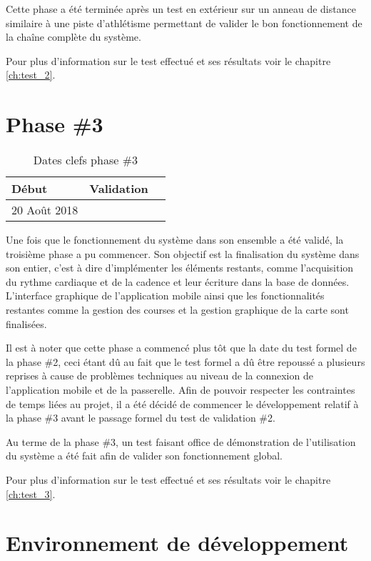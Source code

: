 Cette phase a été terminée après un test en extérieur sur un anneau de distance similaire à une piste d'athlétisme permettant de valider le bon fonctionnement de la chaîne complète du système.

Pour plus d'information sur le test effectué et ses résultats voir le chapitre \ref{ch:test_2}.

\section{Phase \#3}

\begin{table}[htb]
\caption{Dates clefs phase \#3}
\label{tab:detail_phase_3}
\centering
\begin{tabular}{ l l l }
\toprule
Début & Validation \\
\midrule
20 Août 2018 & \todo{}  \\
\bottomrule 
\end{tabular}
\end{table}

Une fois que le fonctionnement du système dans son ensemble a été validé, la troisième phase a pu commencer. Son objectif est la finalisation du système dans son entier, c'est à dire d'implémenter les éléments restants, comme l'acquisition du rythme cardiaque et de la cadence et leur écriture dans la base de données. L'interface graphique de l'application mobile ainsi que les fonctionnalités restantes comme la gestion des courses et la gestion graphique de la carte sont finalisées.

Il est à noter que cette phase a commencé plus tôt que la date du test formel de la phase \#2, ceci étant dû au fait que le test formel a dû être repoussé a plusieurs reprises à cause de problèmes techniques au niveau de la connexion de l'application mobile et de la passerelle. Afin de pouvoir respecter les contraintes de temps liées au projet, il a été décidé de commencer le développement relatif à la phase \#3 avant le passage formel du test de validation \#2.

Au terme de la phase \#3, un test faisant office de démonstration de l'utilisation du système a été fait afin de valider son fonctionnement global.

Pour plus d'information sur le test effectué et ses résultats voir le chapitre \ref{ch:test_3}.

\section{Environnement de développement}

\todo{}

